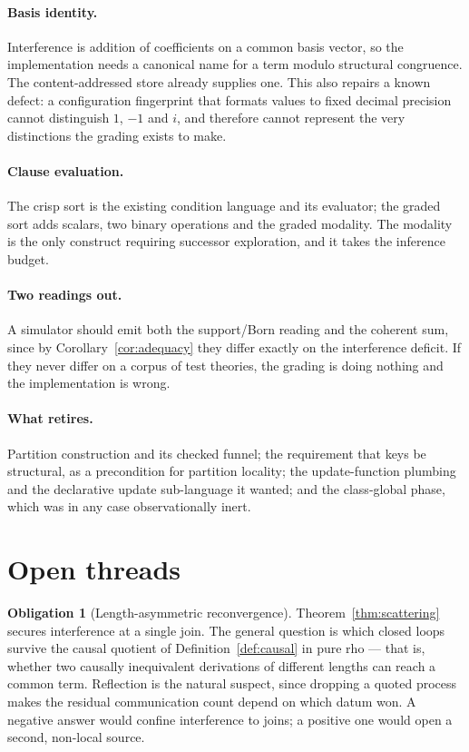 \documentclass[11pt,a4paper]{article}
\theoremstyle{plain}
\theoremstyle{definition}
\newtheorem{obligation}[theorem]{Obligation}
\theoremstyle{remark}
\begin{document}
\paragraph{Basis identity.} Interference is addition of coefficients on a common
basis vector, so the implementation needs a canonical name for a term modulo
structural congruence. The content-addressed store already supplies one. This
also repairs a known defect: a configuration fingerprint that formats values to
fixed decimal precision cannot distinguish $1$, $-1$ and $i$, and therefore
cannot represent the very distinctions the grading exists to make.

\paragraph{Clause evaluation.} The crisp sort is the existing condition language
and its evaluator; the graded sort adds scalars, two binary operations and the
graded modality. The modality is the only construct requiring successor
exploration, and it takes the inference budget.

\paragraph{Two readings out.} A simulator should emit both the support/Born
reading and the coherent sum, since by Corollary~\ref{cor:adequacy} they differ
exactly on the interference deficit. If they never differ on a corpus of test
theories, the grading is doing nothing and the implementation is wrong.

\paragraph{What retires.} Partition construction and its checked funnel; the
requirement that keys be structural, as a precondition for partition locality;
the update-function plumbing and the declarative update sub-language it wanted;
and the class-global phase, which was in any case observationally inert.

\section{Open threads}\label{sec:open}

\begin{obligation}[Length-asymmetric reconvergence]\label{ob:asym}
Theorem~\ref{thm:scattering} secures interference at a single join. The general
question is which closed loops survive the causal quotient of
Definition~\ref{def:causal} in pure rho --- that is, whether two causally
inequivalent derivations of different lengths can reach a common term. Reflection
is the natural suspect, since dropping a quoted process makes the residual
communication count depend on which datum won. A negative answer would confine
interference to joins; a positive one would open a second, non-local source.
\end{obligation}
\end{document}
